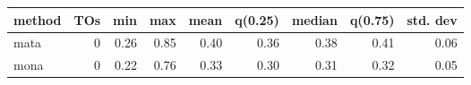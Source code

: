 \begin{tabular}{lrrrrrrrr}
\hline
 method   &   TOs &   min &   max &   mean &   q(0.25) &   median &   q(0.75) &   std. dev \\
\hline
 mata     &  0 &  0.26 &  0.85 &   0.40 &      0.36 &     0.38 &      0.41 &       0.06 \\
 mona     &  0 &  0.22 &  0.76 &   0.33 &      0.30 &     0.31 &      0.32 &       0.05 \\
\hline
\end{tabular}
